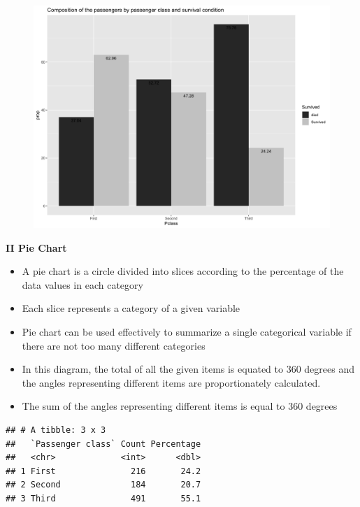 \documentclass[]{book}
\providecommand{\tightlist}{%
  \setlength{\itemsep}{0pt}\setlength{\parskip}{0pt}}
\begin{document}
\begin{figure}

{\centering \includegraphics[width=1\linewidth]{figure/box12-1} 

}

\end{figure}

\textbf{II Pie Chart}

\begin{itemize}
\tightlist
\item
  A pie chart is a circle divided into slices according to the percentage of the data values in each category
\item
  Each slice represents a category of a given variable
\item
  Pie chart can be used effectively to summarize a single categorical variable if there are not too many different categories
\item
  In this diagram, the total of all the given items is equated to 360 degrees and the angles representing different items are proportionately calculated.
\item
  The sum of the angles representing different items is equal to 360 degrees
\end{itemize}

\begin{verbatim}
## # A tibble: 3 x 3
##   `Passenger class` Count Percentage
##   <chr>             <int>      <dbl>
## 1 First               216       24.2
## 2 Second              184       20.7
## 3 Third               491       55.1
\end{verbatim}
\end{document}
